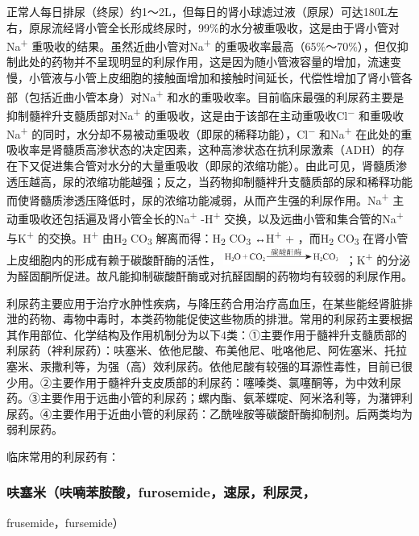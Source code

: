 正常人每日排尿（终尿）约1～2L，但每日的肾小球滤过液（原尿）可达180L左右，原尿流经肾小管全长形成终尿时，99\%的水分被重吸收，这是由于肾小管对Na\textsuperscript{+}
重吸收的结果。虽然近曲小管对Na\textsuperscript{+}
的重吸收率最高（65\%～70\%），但仅抑制此处的药物并不呈现明显的利尿作用，这是因为随小管液容量的增加，流速变慢，小管液与小管上皮细胞的接触面增加和接触时间延长，代偿性增加了肾小管各部（包括近曲小管本身）对Na\textsuperscript{+}
和水的重吸收率。目前临床最强的利尿药主要是抑制髓袢升支髓质部对Na\textsuperscript{+}
的重吸收，这是由于该部在主动重吸收Cl\textsuperscript{−}
和重吸收Na\textsuperscript{+}
的同时，水分却不易被动重吸收（即尿的稀释功能），Cl\textsuperscript{−}
和Na\textsuperscript{+}
在此处的重吸收率是肾髓质高渗状态的决定因素，这种高渗状态在抗利尿激素（ADH）的存在下又促进集合管对水分的大量重吸收（即尿的浓缩功能）。由此可见，肾髓质渗透压越高，尿的浓缩功能越强；反之，当药物抑制髓袢升支髓质部的尿和稀释功能而使肾髓质渗透压降低时，尿的浓缩功能减弱，从而产生强的利尿作用。Na\textsuperscript{+}
主动重吸收还包括遍及肾小管全长的Na\textsuperscript{+}
-H\textsuperscript{+} 交换，以及远曲小管和集合管的Na\textsuperscript{+}
与K\textsuperscript{+} 的交换。H\textsuperscript{+} 由H\textsubscript{2}
CO\textsubscript{3} 解离而得：H\textsubscript{2} CO\textsubscript{3}
↔H\textsuperscript{+} +{} ，而H\textsubscript{2} CO\textsubscript{3}
在肾小管上皮细胞内的形成有赖于碳酸酐酶的活性，\includegraphics[width=1.5625in,height=0.21875in]{./images/Image00580.jpg}
；K\textsuperscript{+}
的分泌为醛固酮所促进。故凡能抑制碳酸酐酶或对抗醛固酮的药物均有较弱的利尿作用。

利尿药主要应用于治疗水肿性疾病，与降压药合用治疗高血压，在某些能经肾脏排泄的药物、毒物中毒时，本类药物能促使这些物质的排泄。常用的利尿药主要根据其作用部位、化学结构及作用机制分为以下4类：①主要作用于髓袢升支髓质部的利尿药（袢利尿药）：呋塞米、依他尼酸、布美他尼、吡咯他尼、阿佐塞米、托拉塞米、汞撒利等，为强（高）效利尿药。依他尼酸有较强的耳源性毒性，目前已很少用。②主要作用于髓袢升支皮质部的利尿药：噻嗪类、氯噻酮等，为中效利尿药。③主要作用于远曲小管的利尿药；螺内酯、氨苯蝶啶、阿米洛利等，为潴钾利尿药。④主要作用于近曲小管的利尿药：乙酰唑胺等碳酸酐酶抑制剂。后两类均为弱利尿药。

临床常用的利尿药有：

\subsubsection{呋塞米（呋喃苯胺酸，furosemide，速尿，利尿灵，}
frusemide，fursemide）

